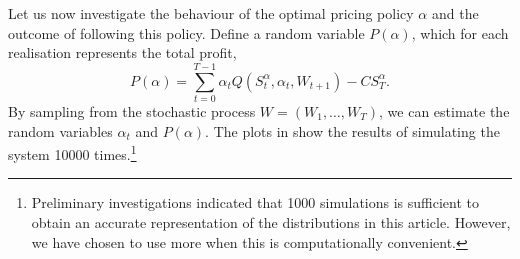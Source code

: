 \documentclass[main.tex]{subfiles}
\begin{document}
Let us now investigate the behaviour of the optimal pricing policy
$\alpha$ and
the outcome of following this policy.
Define a random variable $P(\alpha)$, which for each realisation
represents the total profit,
\begin{equation}
  P(\alpha) = \sum_{t=0}^{T-1}\alpha_tQ(S_t^\alpha,\alpha_t,W_{t+1}) - CS_T^\alpha.
\end{equation}
By sampling from the stochastic process $W=(W_1,\dots,W_T)$, we can
estimate the random variables $\alpha_t$ and $P(\alpha)$.
The plots in  show the results of
simulating the system \num{10000} times.\footnote{Preliminary
  investigations indicated that \num{1000}
  simulations is sufficient to obtain an accurate representation of
  the distributions in this article. However, we have chosen to use
  more when this is computationally convenient.
}
\end{document}
